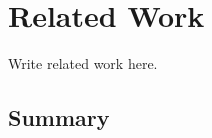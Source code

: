 \chapter{Related Work}\label{chp:relatedwork}
\graphicspath{{figures/chapter_3/}} %
Write related work here. 
\section{Summary}
